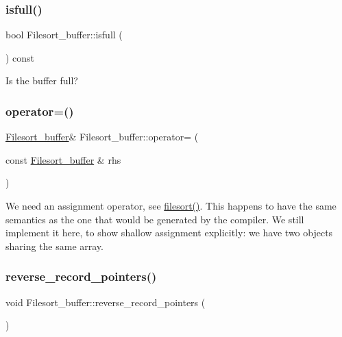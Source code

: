 \subsubsection{\texorpdfstring{isfull()}{isfull()}}
{\footnotesize\ttfamily bool Filesort\+\_\+buffer\+::isfull (\begin{DoxyParamCaption}{ }\end{DoxyParamCaption}) const\hspace{0.3cm}{\ttfamily [inline]}}

Is the buffer full? \mbox{\label{classFilesort__buffer_a3706c904c133aa91efa0838984053a7d}} 
\subsubsection{\texorpdfstring{operator=()}{operator=()}}
{\footnotesize\ttfamily \mbox{\hyperlink{classFilesort__buffer}{Filesort\+\_\+buffer}}\& Filesort\+\_\+buffer\+::operator= (\begin{DoxyParamCaption}\item[{const \mbox{\hyperlink{classFilesort__buffer}{Filesort\+\_\+buffer}} \&}]{rhs }\end{DoxyParamCaption})\hspace{0.3cm}{\ttfamily [inline]}}

We need an assignment operator, see \mbox{\hyperlink{filesort_8cc_a953fde8362f86f7fb832e9a1e2c06530}{filesort()}}. This happens to have the same semantics as the one that would be generated by the compiler. We still implement it here, to show shallow assignment explicitly\+: we have two objects sharing the same array. \mbox{\label{classFilesort__buffer_a7772b898cdbd3117acb45a59c9b79cf1}} 
\subsubsection{\texorpdfstring{reverse\+\_\+record\+\_\+pointers()}{reverse\_record\_pointers()}}
{\footnotesize\ttfamily void Filesort\+\_\+buffer\+::reverse\+\_\+record\+\_\+pointers (\begin{DoxyParamCaption}{ }\end{DoxyParamCaption})\hspace{0.3cm}{\ttfamily [inline]}}

